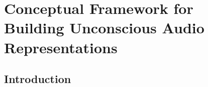 \documentclass[a4paper,10pt,final]{ThesisStyle}
\begin{document}





\chapter{Conceptual Framework for Building Unconscious Audio Representations}
\label{ch:conceptual-audio}
\minitoc

\section{Introduction}



\end{document}
